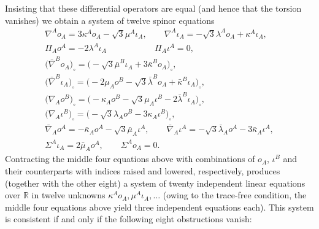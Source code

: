 \documentclass[10pt,a4paper]{amsart}
\numberwithin{equation}{section}
\begin{document}
Insisting that these differential operators are equal (and hence that the
torsion vanishes) we obtain a system of twelve spinor equations
\begin{gather*}
\nabla^Ao_A = 3\kappa^Ao_A - \sqrt{3}\mu^A\iota_A,
\qquad \nabla^A\iota_A = -\sqrt{3}\lambda^Ao_A + \kappa^A\iota_A, \\	
\Pi_Ao^A = -2\lambda^A\iota_A \hspace{67pt} \Pi_A\iota^A = 0, \\
 \big(\bar{\nabla}^Bo_A\big)_\circ
 = \big({-} \sqrt{3}\bar{\mu}^B\iota_A + 3\bar{\kappa}^Bo_A\big)_\circ,\\
\big(\bar{\nabla}^B\iota_A\big)_\circ
 = \big({-}2\mu_Ao^B - \sqrt{3}\bar{\lambda}^Bo_A + \bar{\kappa}^B\iota_A\big)_\circ, \\
\big(\nabla_Ao^B\big)_\circ
 = \big({-}\kappa_Ao^B - \sqrt{3}\mu_A\iota^B - 2\bar{\lambda}^B\iota_A\big)_\circ, \\
\big(\nabla_A\iota^B\big)_\circ
 = \big({-} \sqrt{3}\lambda_Ao^B - 3\kappa_A\iota^B \big)_\circ, \\
\bar{\nabla}_Ao^A
 = - \bar{\kappa}_Ao^A - \sqrt{3}\bar{\mu}_A\iota^A,\qquad
\bar{\nabla}_A\iota^A
 = -\sqrt{3}\bar{\lambda}_Ao^A - 3\bar{\kappa}_A\iota^A, \\
\Sigma^A\iota_A = 2\bar{\mu}_Ao^A, \qquad \Sigma^Ao_A = 0 .
\end{gather*}
Contracting the middle four equations above with combinations of
$o_A$, $\iota^B$ and their counterparts with indices raised and lowered,
respectively, produces (together with the other eight) a system of twenty
independent linear equations over $\mathbb{R}$ in twelve unknowns $\kappa^A
o_A, \mu^A\iota_A, \dots $ (owing to the trace-free condition, the middle four
equations above yield three independent equations each). This system
is consistent if and only if the following eight obstructions vanish:
\end{document}
